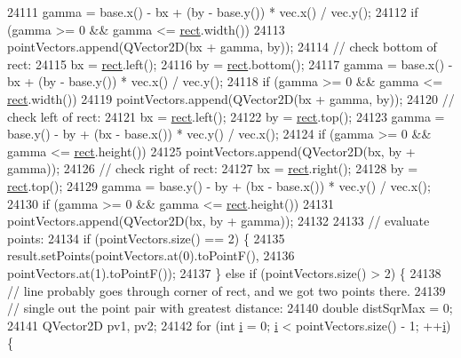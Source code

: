 \begin{DoxyCode}
24111     gamma = base.x() - bx + (by - base.y()) * vec.x() / vec.y();
24112     \textcolor{keywordflow}{if} (gamma >= 0 && gamma <= \hyperlink{_gen_blob_8m_aea8f6815d9a63491fc422c5572c6b3c3}{rect}.width())
24113       pointVectors.append(QVector2D(bx + gamma, by));
24114     \textcolor{comment}{// check bottom of rect:}
24115     bx = \hyperlink{_gen_blob_8m_aea8f6815d9a63491fc422c5572c6b3c3}{rect}.left();
24116     by = \hyperlink{_gen_blob_8m_aea8f6815d9a63491fc422c5572c6b3c3}{rect}.bottom();
24117     gamma = base.x() - bx + (by - base.y()) * vec.x() / vec.y();
24118     \textcolor{keywordflow}{if} (gamma >= 0 && gamma <= \hyperlink{_gen_blob_8m_aea8f6815d9a63491fc422c5572c6b3c3}{rect}.width())
24119       pointVectors.append(QVector2D(bx + gamma, by));
24120     \textcolor{comment}{// check left of rect:}
24121     bx = \hyperlink{_gen_blob_8m_aea8f6815d9a63491fc422c5572c6b3c3}{rect}.left();
24122     by = \hyperlink{_gen_blob_8m_aea8f6815d9a63491fc422c5572c6b3c3}{rect}.top();
24123     gamma = base.y() - by + (bx - base.x()) * vec.y() / vec.x();
24124     \textcolor{keywordflow}{if} (gamma >= 0 && gamma <= \hyperlink{_gen_blob_8m_aea8f6815d9a63491fc422c5572c6b3c3}{rect}.height())
24125       pointVectors.append(QVector2D(bx, by + gamma));
24126     \textcolor{comment}{// check right of rect:}
24127     bx = \hyperlink{_gen_blob_8m_aea8f6815d9a63491fc422c5572c6b3c3}{rect}.right();
24128     by = \hyperlink{_gen_blob_8m_aea8f6815d9a63491fc422c5572c6b3c3}{rect}.top();
24129     gamma = base.y() - by + (bx - base.x()) * vec.y() / vec.x();
24130     \textcolor{keywordflow}{if} (gamma >= 0 && gamma <= \hyperlink{_gen_blob_8m_aea8f6815d9a63491fc422c5572c6b3c3}{rect}.height())
24131       pointVectors.append(QVector2D(bx, by + gamma));
24132 
24133     \textcolor{comment}{// evaluate points:}
24134     \textcolor{keywordflow}{if} (pointVectors.size() == 2) \{
24135       result.setPoints(pointVectors.at(0).toPointF(),
24136                        pointVectors.at(1).toPointF());
24137     \} \textcolor{keywordflow}{else} \textcolor{keywordflow}{if} (pointVectors.size() > 2) \{
24138       \textcolor{comment}{// line probably goes through corner of rect, and we got two points there.}
24139       \textcolor{comment}{// single out the point pair with greatest distance:}
24140       \textcolor{keywordtype}{double} distSqrMax = 0;
24141       QVector2D pv1, pv2;
24142       \textcolor{keywordflow}{for} (\textcolor{keywordtype}{int} \hyperlink{_comparision_pictures_2_createtest_image_8m_a6f6ccfcf58b31cb6412107d9d5281426}{i} = 0; \hyperlink{_comparision_pictures_2_createtest_image_8m_a6f6ccfcf58b31cb6412107d9d5281426}{i} < pointVectors.size() - 1; ++\hyperlink{_comparision_pictures_2_createtest_image_8m_a6f6ccfcf58b31cb6412107d9d5281426}{i}) \{

\end{DoxyCode}
